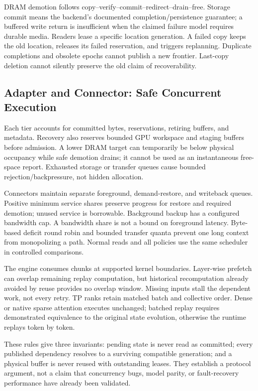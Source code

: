 DRAM demotion follows copy--verify--commit--redirect--drain--free. Storage
commit means the backend's documented completion/persistence guarantee;
a buffered write return is insufficient when the claimed failure model
requires durable media. Readers lease a specific location generation.
A failed copy keeps the old location, releases its failed reservation,
and triggers replanning. Duplicate completions and obsolete epochs cannot
publish a new frontier. Last-copy deletion cannot silently preserve the
old claim of recoverability.

\subsection{Adapter and Connector: Safe Concurrent Execution}
\label{sec:kv-runtime}

Each tier accounts for committed bytes, reservations, retiring buffers,
and metadata. Recovery also reserves bounded GPU workspace and staging
buffers before admission. A lower DRAM target can temporarily be below
physical occupancy while safe demotion drains; it cannot be used as an
instantaneous free-space report. Exhausted storage or transfer queues
cause bounded rejection/backpressure, not hidden allocation.

Connectors maintain separate foreground, demand-restore, and writeback
queues. Positive minimum service shares preserve progress for restore
and required demotion; unused service is borrowable. Background backup
has a configured bandwidth cap. A bandwidth share is not a bound on
foreground latency. Byte-based deficit round robin and bounded transfer
quanta prevent one long context from monopolizing a path. Normal reads
and all policies use the same scheduler in controlled comparisons.

The engine consumes chunks at supported kernel boundaries. Layer-wise
prefetch can overlap remaining replay computation, but historical
recomputation already avoided by reuse provides no overlap window.
Missing inputs stall the dependent work, not every retry. TP ranks retain
matched batch and collective order. Dense or native sparse attention
executes unchanged; batched replay requires demonstrated equivalence to
the original state evolution, otherwise the runtime replays token by token.

These rules give three invariants: pending state is never read as committed;
every published dependency resolves to a surviving compatible generation;
and a physical buffer is never reused with outstanding leases. They
establish a protocol argument, not a claim that concurrency bugs, model
parity, or fault-recovery performance have already been validated.
